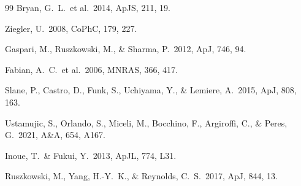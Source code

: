 \documentclass[11pt,a4paper]{article}
\begin{document}
\begin{thebibliography}{99}
 Bryan, G.\ L.\ et al.\ 2014, ApJS, 211, 19.

 Ziegler, U.\ 2008, CoPhC, 179, 227.

 Gaspari, M., Ruszkowski, M., \& Sharma, P.\ 2012, ApJ, 746, 94.

 Fabian, A.\ C.\ et al.\ 2006, MNRAS, 366, 417.

 Slane, P., Castro, D., Funk, S., Uchiyama, Y., \& Lemiere, A.\ 2015, ApJ, 808, 163.

 Ustamujic, S., Orlando, S., Miceli, M., Bocchino, F., Argiroffi, C., \& Peres, G.\ 2021, A\&A, 654, A167.

 Inoue, T.\ \& Fukui, Y.\ 2013, ApJL, 774, L31.

 Ruszkowski, M., Yang, H.-Y.\ K., \& Reynolds, C.\ S.\ 2017, ApJ, 844, 13.

\end{thebibliography}
\end{document}
